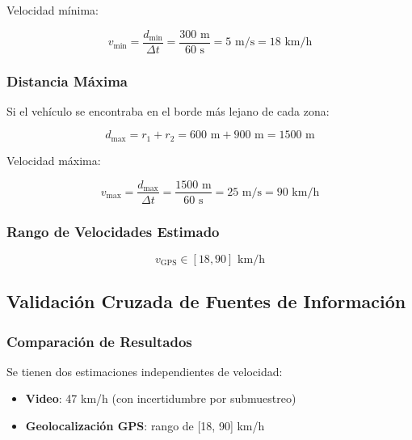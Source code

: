 \documentclass[12pt]{article}
\begin{document}
Velocidad mínima:

\begin{equation}
v_{\min} = \frac{d_{\min}}{\Delta t} = \frac{300 \text{ m}}{60 \text{ s}} = 5 \text{ m/s} = 18 \text{ km/h}
\end{equation}

\subsubsection*{Distancia Máxima}

Si el vehículo se encontraba en el borde más lejano de cada zona:

\begin{equation}
d_{\max} = r_1 + r_2 = 600 \text{ m} + 900 \text{ m} = 1500 \text{ m}
\end{equation}

Velocidad máxima:

\begin{equation}
v_{\max} = \frac{d_{\max}}{\Delta t} = \frac{1500 \text{ m}}{60 \text{ s}} = 25 \text{ m/s} = 90 \text{ km/h}
\end{equation}

\subsubsection*{Rango de Velocidades Estimado}

\begin{equation}
v_{\text{GPS}} \in [18, 90] \text{ km/h}
\end{equation}

\subsection*{Validación Cruzada de Fuentes de Información}

\subsubsection*{Comparación de Resultados}

Se tienen dos estimaciones independientes de velocidad:

\begin{itemize}
    \item \textbf{Video}: 47 km/h (con incertidumbre por submuestreo)
    \item \textbf{Geolocalización GPS}: rango de [18, 90] km/h
\end{itemize}
\end{document}
